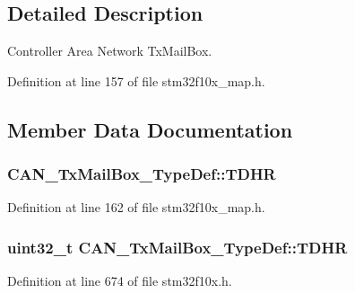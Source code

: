 \subsection{Detailed Description}
Controller Area Network Tx\+Mail\+Box. 

Definition at line 157 of file stm32f10x\+\_\+map.\+h.



\subsection{Member Data Documentation}
\subsubsection[{\texorpdfstring{T\+D\+HR}{TDHR}}]{ C\+A\+N\+\_\+\+Tx\+Mail\+Box\+\_\+\+Type\+Def\+::\+T\+D\+HR}\hypertarget{struct_c_a_n___tx_mail_box___type_def_ada4a0f2f50aa4b190d74708a65419b7b}{}\label{struct_c_a_n___tx_mail_box___type_def_ada4a0f2f50aa4b190d74708a65419b7b}


Definition at line 162 of file stm32f10x\+\_\+map.\+h.

\subsubsection[{\texorpdfstring{T\+D\+HR}{TDHR}}]{ {\bf uint32\+\_\+t} C\+A\+N\+\_\+\+Tx\+Mail\+Box\+\_\+\+Type\+Def\+::\+T\+D\+HR}\hypertarget{struct_c_a_n___tx_mail_box___type_def_a98c6bcd7c9bae378ebf83fd9f5b59020}{}\label{struct_c_a_n___tx_mail_box___type_def_a98c6bcd7c9bae378ebf83fd9f5b59020}


Definition at line 674 of file stm32f10x.\+h.

